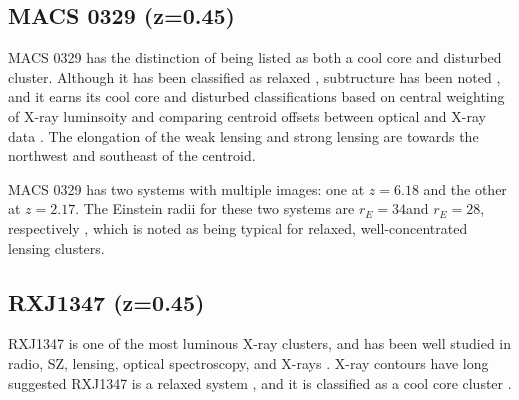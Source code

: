 \documentclass[iop,numberedappendix,apj]{emulateapj}
\begin{document}

\subsection{MACS 0329 (z=0.45)}
\label{sec:results_m0329}


MACS 0329 has the distinction of being listed as both a cool core and disturbed cluster. Although it has
been classified as relaxed \citep{schmidt2007}, subtructure has been noted \citep{maughan2008}, and it earns
its cool core and disturbed classifications based on central weighting of X-ray luminsoity and comparing
centroid offsets between optical and X-ray data \citep{sayers2013}. The elongation of the weak lensing and
strong lensing are towards the northwest and southeast of the centroid.

MACS 0329 has two systems with multiple images: one at $z = 6.18$ and the other at $z = 2.17$. The Einstein
radii for these two systems are $r_E = 34$\asecs and $r_E = 28$\asec, respectively \citep{zitrin2012b}, which is
noted as being typical for relaxed, well-concentrated lensing clusters. 




\subsection{RXJ1347 (z=0.45)}
\label{sec:results_rxj1347}


RXJ1347 is one of the most luminous X-ray clusters, and has been well studied in radio, SZ, lensing, optical
spectroscopy, and X-rays \citep[e.g.][]{schindler1995,allen2002, pointecouteau1999,komatsu2001,kitayama2004,
gitti2007b,ota2008,bradac2008,miranda2008}. X-ray contours have long suggested RXJ1347 is a relaxed system
\citep[e.g.][]{schindler1997}, and it is classified as a cool core cluster \citep[e.g.][]{mann2012,sayers2013}. 
\end{document}
